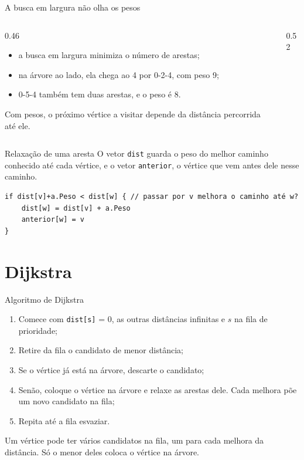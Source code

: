 \documentclass{beamer}
\begin{document}
\begin{frame}{A busca em largura não olha os pesos}
	\begin{columns}[c]
		\begin{column}{0.46\textwidth}
			\footnotesize
			\begin{itemize}
				\item a busca em largura minimiza o número de arestas;
				\item na árvore ao lado, ela chega ao 4 por 0-2-4, com peso 9;
				\item 0-5-4 também tem duas arestas, e o peso é 8.
			\end{itemize}
			\vspace{0.2cm}
			Com pesos, o próximo vértice a visitar depende da distância percorrida
			até ele.
		\end{column}
		\begin{column}{0.52\textwidth}
			\begin{center}
				\scalebox{0.82}{\grafoGPbfs}
			\end{center}
		\end{column}
	\end{columns}
\end{frame}

\begin{frame}[fragile]{Relaxação de uma aresta}
	\footnotesize
	O vetor \texttt{dist} guarda o peso do melhor caminho conhecido até cada
	vértice, e o vetor \texttt{anterior}, o vértice que vem antes dele nesse
	caminho.
	\begin{center}
		\scalebox{0.72}{\relaxacao}
	\end{center}
	\begin{verbatim}
if dist[v]+a.Peso < dist[w] { // passar por v melhora o caminho até w?
    dist[w] = dist[v] + a.Peso
    anterior[w] = v
}
\end{verbatim}
\end{frame}

\section{Dijkstra}

\begin{frame}{Algoritmo de Dijkstra}
	\begin{enumerate}
		\item Comece com \texttt{dist[s]} = 0, as outras distâncias infinitas e
		      $s$ na fila de prioridade;
		\item Retire da fila o candidato de menor distância;
		\item Se o vértice já está na árvore, descarte o candidato;
		\item Senão, coloque o vértice na árvore e relaxe as arestas dele. Cada
		      melhora põe um novo candidato na fila;
		\item Repita até a fila esvaziar.
	\end{enumerate}
	\vspace{0.3cm}
	\footnotesize
	Um vértice pode ter vários candidatos na fila, um para cada melhora da
	distância. Só o menor deles coloca o vértice na árvore.
\end{frame}
\end{document}
